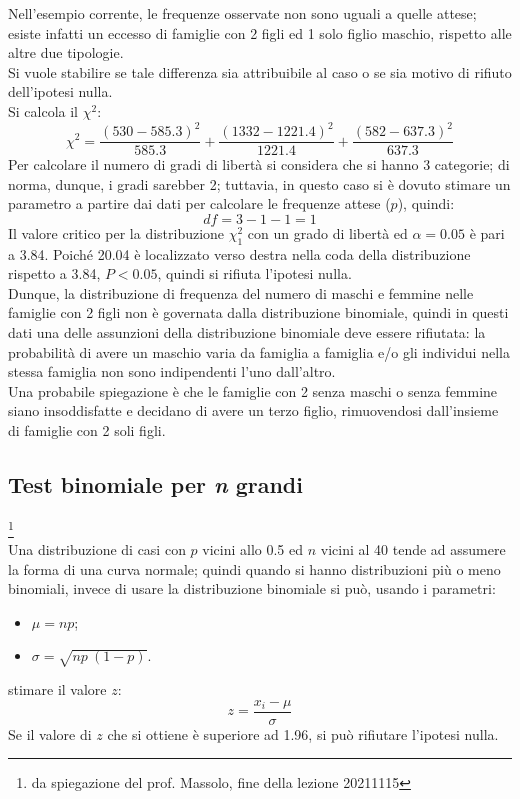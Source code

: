 \documentclass[10pt, draft]{book}
\newcounter{example}[section]
\begin{document}
\begin{example}
\begin{figure}[H]
    \caption{\small{}}
    \end{figure}
    Nell'esempio corrente, le frequenze osservate non sono uguali a quelle attese; esiste infatti un eccesso di famiglie con 2 figli ed 1 solo figlio maschio, rispetto alle altre due tipologie.
    \\
    Si vuole stabilire se tale differenza sia attribuibile al caso o se sia motivo di rifiuto dell'ipotesi nulla.
    \\
    Si calcola il $\chi^2$:
    \begin{equation}
    \chi^2 = \frac{(530-585.3)^2}{585.3}+\frac{(1332-1221.4)^2}{1221.4}+\frac{(582-637.3)^2}{637.3}
    \end{equation}
    Per calcolare il numero di gradi di libertà si considera che si hanno 3 categorie; di norma, dunque, i gradi sarebber 2; tuttavia, in questo caso si è dovuto stimare un parametro a partire dai dati per calcolare le frequenze attese ($p$), quindi:
    \begin{equation}
    df = 3-1-1 = 1
    \end{equation}
    Il valore critico per la distribuzione $\chi^2_1$ con un grado di libertà ed $\alpha= 0.05$ è pari a 3.84. Poiché 20.04 è localizzato verso destra nella coda della distribuzione rispetto a 3.84, $P < 0.05$, quindi si rifiuta l'ipotesi nulla.
    \\
    Dunque, la distribuzione di frequenza del numero di maschi e femmine nelle famiglie con 2 figli non è governata dalla distribuzione binomiale, quindi in questi dati una delle assunzioni della distribuzione binomiale deve essere rifiutata: la probabilità di avere un maschio varia da famiglia a famiglia e/o gli individui nella stessa famiglia non sono indipendenti l'uno dall'altro.
    \\
    Una probabile spiegazione è che le famiglie con 2 senza maschi o senza femmine siano insoddisfatte e decidano di avere un terzo figlio, rimuovendosi dall'insieme di famiglie con 2 soli figli.
\end{example}

\subsection{Test binomiale per \textit{n} grandi}\footnote{da spiegazione del prof. Massolo, fine della lezione 20211115}
\\
Una distribuzione di casi con $p$ vicini allo 0.5 ed $n$ vicini al 40 tende ad assumere la forma di una curva normale; quindi quando si hanno distribuzioni più o meno binomiali, invece di usare la distribuzione binomiale si può, usando i parametri:
\begin{itemize}
    \item $\mu = np$;
    \item $\sigma = \sqrt{np\ (1-p)}$.
\end{itemize}
stimare il valore $z$:
\begin{equation}
z = \frac{x_i-\mu}{\sigma}
\end{equation}
Se il valore di $z$ che si ottiene è superiore ad 1.96, si può rifiutare l'ipotesi nulla.
\end{document}
